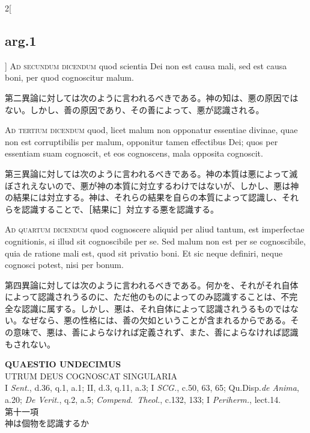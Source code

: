 \documentclass[paper=a4paper,fontsize=10pt,jafontsize=9pt,titlepage]{jlreq}
\begin{document}
\begin{paracol}{2}[\subsection{arg.1}]
{\scshape Ad secundum dicendum} quod scientia Dei non est causa mali,
sed est causa boni, per quod cognoscitur malum.

\switchcolumn

第二異論に対しては次のように言われるべきである。神の知は、悪の原因では
ない。しかし、善の原因であり、その善によって、悪が認識される。

\switchcolumn*[\subsection{ad.3}]

{\scshape Ad tertium dicendum} quod, licet malum non opponatur
essentiae divinae, quae non est corruptibilis per malum, opponitur
tamen effectibus Dei; quos per essentiam suam cognoscit, et eos
cognoscens, mala opposita cognoscit.

\switchcolumn

第三異論に対しては次のように言われるべきである。神の本質は悪によって滅
ぼされえないので、悪が神の本質に対立するわけではないが、しかし、悪は神
の結果には対立する。神は、それらの結果を自らの本質によって認識し、それ
らを認識することで、［結果に］対立する悪を認識する。

\switchcolumn*[\subsection{ad.4}]

{\scshape Ad quartum dicendum} quod cognoscere aliquid per aliud
tantum, est imperfectae cognitionis, si illud sit cognoscibile per
se. Sed malum non est per se cognoscibile, quia de ratione mali est,
quod sit privatio boni. Et sic neque definiri, neque cognosci potest,
nisi per bonum.

\switchcolumn

第四異論に対しては次のように言われるべきである。何かを、それがそれ自体
によって認識されうるのに、ただ他のものによってのみ認識することは、不完
全な認識に属する。しかし、悪は、それ自体によって認識されうるものではな
い。なぜなら、悪の性格には、善の欠如ということが含まれるからである。そ
の意味で、悪は、善によらなければ定義されず、また、善によらなければ認識
もされない。

\end{paracol}


\newpage


{}
\setcounter{section}{11}
\setcounter{subsection}{0}
\begin{center}
{\Large {\bfseries QUAESTIO UNDECIMUS}}\\ {\large UTRUM DEUS COGNOSCAT
SINGULARIA}\\ {\footnotesize I {\itshape Sent.}, d.36, q.1, a.1;
II, d.3, q.11, a.3; I {\itshape SCG.}, c.50, 63, 65;
Qu.Disp.{\itshape de Anima}, a.20; {\itshape De Verit.}, q.2,
a.5; {\itshape Compend.~Theol.}, c.132, 133; I {\itshape Periherm.},
lect.14.}\\ {\Large 第十一項\\神は個物を認識するか}
\end{center}
\end{document}
